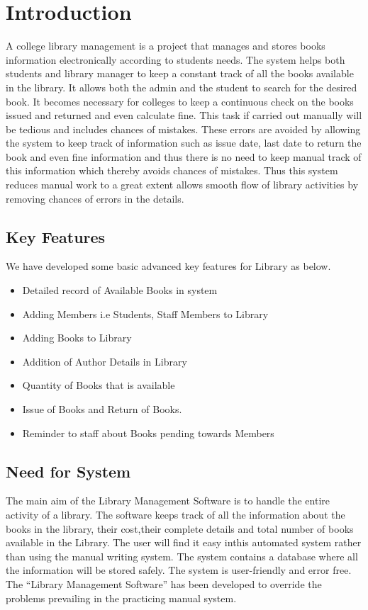 \chapter{Introduction}

\hspace{1cm} A college library management is a project that manages and stores books information electronically
according to students needs. The system helps both students and library manager to keep a constant
track of all the books available in the library. It allows both the admin and the student to search for
the desired book. It becomes necessary for colleges to keep a continuous check on the books issued
and returned and even calculate fine. This task if carried out manually will be tedious and includes
chances of mistakes. These errors are avoided by allowing the system to keep track of information
such as issue date, last date to return the book and even fine information and thus there is no need to
keep manual track of this information which thereby avoids chances of mistakes. Thus this system
reduces manual work to a great extent allows smooth flow of library activities by removing chances
of errors in the details.

\section{Key Features}
	We have developed some basic advanced key features for Library as below.
	\begin{itemize}
		\item Detailed record of Available Books in system
		\item Adding Members i.e Students, Staff Members to Library
		\item Adding Books to Library
		\item Addition of Author Details in Library
		\item Quantity of Books that is available 
		\item Issue of Books and Return of Books.
		\item Reminder to staff about Books pending towards Members
	\end{itemize}

\newpage
\section{Need for System}
The main aim of the Library Management Software is to handle the entire activity of a library. The
software keeps track of all the information about the books in the library, their cost,their complete
details and total number of books available in the Library. The user will find it easy inthis
automated system rather than using the manual writing system. The system contains a database
where all the information will be stored safely. The system is user-friendly and error free. The
“Library Management Software” has been developed to override the problems prevailing in the
practicing manual system.

